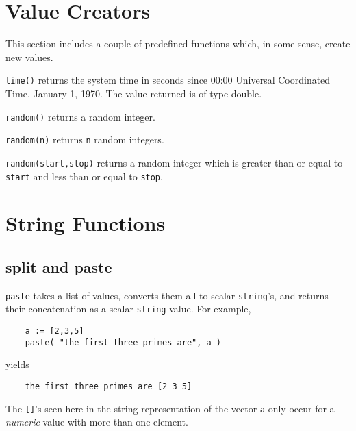 \begin{sloppy}
\begin{list}{}{}
\end{list}
\end{sloppy}

\section{Value Creators}
\label{predefineds-creators}

This section includes a couple of predefined functions which, in some
sense, create new values. 
\begin{sloppy}
\begin{list}{}{}
\item[{\tt time()}] \label{time-func} 
returns the system time in seconds since 00:00 Universal Coordinated Time,
January 1, 1970. The value returned is of type double.

\item[{\tt random()}] \label{random0-func}
returns a random integer.

\item[{\tt random(n)}] \label{random1-func}
returns {\tt n} random integers.

\item[{\tt random(start,stop)}] \label{random2-func}
returns a random integer which is greater than or equal to {\tt start} and
less than or equal to {\tt stop}.

\end{list}
\end{sloppy}

\section{String Functions}
\label{predefineds-string}


\subsection{split and paste}
{\tt paste} \label{paste-func} 
takes a list of values, converts them all to scalar {\tt string}'s,
and returns their concatenation as a scalar {\tt string} value.
For example,
\begin{verbatim}
    a := [2,3,5]
    paste( "the first three primes are", a )
\end{verbatim}
yields
\begin{verbatim}
    the first three primes are [2 3 5]
\end{verbatim}
The {\tt []}'s seen here in the string representation of the vector {\tt a}
only occur for a {\em numeric} value with more than one element.

